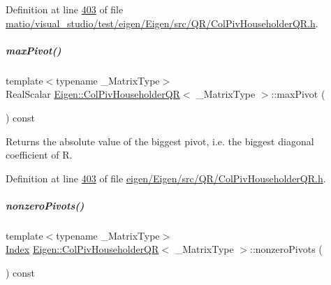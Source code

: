 Definition at line \hyperlink{matio_2visual__studio_2test_2eigen_2_eigen_2src_2_q_r_2_col_piv_householder_q_r_8h_source_l00403}{403} of file \hyperlink{matio_2visual__studio_2test_2eigen_2_eigen_2src_2_q_r_2_col_piv_householder_q_r_8h_source}{matio/visual\+\_\+studio/test/eigen/\+Eigen/src/\+Q\+R/\+Col\+Piv\+Householder\+Q\+R.\+h}.

\mbox{\label{group___q_r___module_aac8c43d720170980f582d01494df9e8f}} 
\subparagraph{\texorpdfstring{max\+Pivot()}{maxPivot()}\hspace{0.1cm}{\footnotesize\ttfamily [2/2]}}
{\footnotesize\ttfamily template$<$typename \+\_\+\+Matrix\+Type$>$ \\
Real\+Scalar \hyperlink{group___q_r___module_class_eigen_1_1_col_piv_householder_q_r}{Eigen\+::\+Col\+Piv\+Householder\+QR}$<$ \+\_\+\+Matrix\+Type $>$\+::max\+Pivot (\begin{DoxyParamCaption}{ }\end{DoxyParamCaption}) const\hspace{0.3cm}{\ttfamily [inline]}}

\begin{DoxyReturn}{Returns}
the absolute value of the biggest pivot, i.\+e. the biggest diagonal coefficient of R. 
\end{DoxyReturn}


Definition at line \hyperlink{eigen_2_eigen_2src_2_q_r_2_col_piv_householder_q_r_8h_source_l00403}{403} of file \hyperlink{eigen_2_eigen_2src_2_q_r_2_col_piv_householder_q_r_8h_source}{eigen/\+Eigen/src/\+Q\+R/\+Col\+Piv\+Householder\+Q\+R.\+h}.

\mbox{\label{group___q_r___module_a796610bab81f0527aa1ae440c71f58a4}} 
\subparagraph{\texorpdfstring{nonzero\+Pivots()}{nonzeroPivots()}\hspace{0.1cm}{\footnotesize\ttfamily [1/2]}}
{\footnotesize\ttfamily template$<$typename \+\_\+\+Matrix\+Type$>$ \\
\hyperlink{namespace_eigen_a62e77e0933482dafde8fe197d9a2cfde}{Index} \hyperlink{group___q_r___module_class_eigen_1_1_col_piv_householder_q_r}{Eigen\+::\+Col\+Piv\+Householder\+QR}$<$ \+\_\+\+Matrix\+Type $>$\+::nonzero\+Pivots (\begin{DoxyParamCaption}{ }\end{DoxyParamCaption}) const\hspace{0.3cm}{\ttfamily [inline]}}

